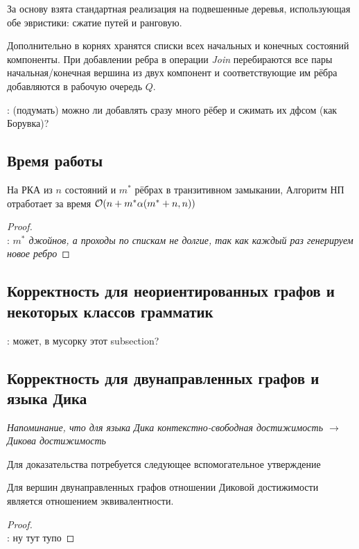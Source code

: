 За основу взята стандартная реализация \cite{Hopcroft1973} на подвешенные деревья, использующая обе эвристики: сжатие путей и ранговую. 


Дополнительно в корнях хранятся списки всех начальных и конечных состояний компоненты. При добавлении ребра в операции \textit{Join} перебираются все пары начальная/конечная вершина из двух компонент и соответствующие им рёбра добавляются в рабочую очередь $Q$. 

\TODO: (подумать) можно ли добавлять сразу много рёбер и сжимать их дфсом (как Борувка)?

\subsection{Время работы}

\begin{theorem}
На РКА из $n$ состояний и $m^{*}$ рёбрах в транзитивном замыкании, Алгоритм НП отработает за время $\mathcal{O}(n + m^{*} \alpha(m^{*} + n, n))$
\end{theorem}

\begin{proof}
~\\
\TODO: \textit{$m^{*}$ джойнов, а проходы по спискам не долгие, так как каждый раз генерируем новое ребро}
\end{proof}

\subsection{Корректность для неориентированных графов и некоторых классов грамматик}

\TODO: может, в мусорку этот subsection?

\subsection{Корректность для двунаправленных графов и языка Дика}

\textit{Напоминание, что для языка Дика контекстно-свободная достижимость $\to$ Дикова достижимость}

Для доказательства потребуется следующее вспомогательное утверждение

\begin{lemma}\label{lemma:bidir_equiv}
    Для вершин двунаправленных графов отношении Диковой достижимости является отношением эквивалентности.
\end{lemma}
\begin{proof}
~\\
\TODO: ну тут тупо

\end{proof}

